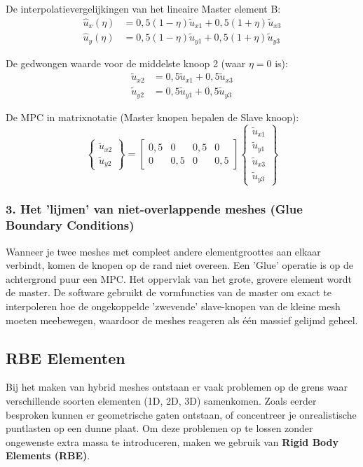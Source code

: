 \documentclass[a4paper,11pt,twoside]{report}
\begin{document}
De interpolatievergelijkingen van het lineaire Master element B:
\begin{align*}
    \hat{u}_x(\eta) & = 0,5(1 - \eta)\tilde{u}_{x1} + 0,5(1 + \eta)\tilde{u}_{x3} \\
    \hat{u}_y(\eta) & = 0,5(1 - \eta)\tilde{u}_{y1} + 0,5(1 + \eta)\tilde{u}_{y3}
\end{align*}

De gedwongen waarde voor de middelste knoop 2 (waar $\eta = 0$ is):
\begin{align*}
    \tilde{u}_{x2} & = 0,5\tilde{u}_{x1} + 0,5\tilde{u}_{x3} \\
    \tilde{u}_{y2} & = 0,5\tilde{u}_{y1} + 0,5\tilde{u}_{y3}
\end{align*}

De MPC in matrixnotatie (Master knopen bepalen de Slave knoop):
\begin{equation*}
    \begin{Bmatrix}
        \tilde{u}_{x2} \\
        \tilde{u}_{y2}
    \end{Bmatrix} =
    \begin{bmatrix}
        0,5 & 0   & 0,5 & 0   \\
        0   & 0,5 & 0   & 0,5
    \end{bmatrix}
    \begin{Bmatrix}
        \tilde{u}_{x1} \\
        \tilde{u}_{y1} \\
        \tilde{u}_{x3} \\
        \tilde{u}_{y3}
    \end{Bmatrix}
\end{equation*}

\subsubsection*{3. Het 'lijmen' van niet-overlappende meshes (Glue Boundary Conditions)}
Wanneer je twee meshes met compleet andere elementgroottes aan elkaar verbindt, komen de knopen op
de rand niet overeen. Een 'Glue' operatie is op de achtergrond puur een MPC. Het oppervlak van het
grote, grovere element wordt de master. De software gebruikt de vormfuncties van de master om exact
te interpoleren hoe de ongekoppelde 'zwevende' slave-knopen van de kleine mesh moeten meebewegen,
waardoor de meshes reageren als één massief gelijmd geheel.
\subsection{RBE Elementen}
Bij het maken van hybrid meshes ontstaan er vaak problemen op de grens waar verschillende soorten
elementen (1D, 2D, 3D) samenkomen. Zoals eerder besproken kunnen er geometrische gaten ontstaan, of
concentreer je onrealistische puntlasten op een dunne plaat. Om deze problemen op te lossen zonder
ongewenste extra massa te introduceren, maken we gebruik van \textbf{Rigid Body Elements (RBE)}.
\end{document}
